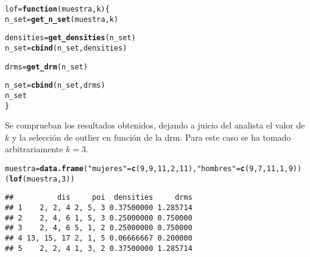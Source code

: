 \documentclass[12pt]{report}\usepackage[]{graphicx}\usepackage[dvipsnames]{xcolor}
\makeatletter
\newcommand{\hlnum}[1]{\textcolor[rgb]{0.686,0.059,0.569}{#1}}%
\newcommand{\hlstr}[1]{\textcolor[rgb]{0.192,0.494,0.8}{#1}}%
\newcommand{\hlstd}[1]{\textcolor[rgb]{0.345,0.345,0.345}{#1}}%
\newcommand{\hlkwa}[1]{\textcolor[rgb]{0.161,0.373,0.58}{\textbf{#1}}}%
\newcommand{\hlkwb}[1]{\textcolor[rgb]{0.69,0.353,0.396}{#1}}%
\newcommand{\hlkwc}[1]{\textcolor[rgb]{0.333,0.667,0.333}{#1}}%
\newcommand{\hlkwd}[1]{\textcolor[rgb]{0.737,0.353,0.396}{\textbf{#1}}}%
\newenvironment{kframe}{%
 \def\at@end@of@kframe{}%
 \ifinner\ifhmode%
  \def\at@end@of@kframe{\end{minipage}}%
  \begin{minipage}{\columnwidth}%
 \fi\fi%
 \def\FrameCommand##1{\hskip\@totalleftmargin \hskip-\fboxsep
 \colorbox{shadecolor}{##1}\hskip-\fboxsep
     \hskip-\linewidth \hskip-\@totalleftmargin \hskip\columnwidth}%
 \MakeFramed {\advance\hsize-\width
   \@totalleftmargin\z@ \linewidth\hsize
   \@setminipage}}%
 {\par\unskip\endMakeFramed%
 \at@end@of@kframe}
\newenvironment{knitrout}{}{} %
\makeatother
\begin{document}
\begin{knitrout}
\color{fgcolor}\begin{kframe}
\begin{alltt}
\hlstd{lof} \hlkwb{=} \hlkwa{function}\hlstd{(}\hlkwc{muestra}\hlstd{,} \hlkwc{k}\hlstd{) \{}
        \hlstd{n_set} \hlkwb{=} \hlkwd{get_n_set}\hlstd{(muestra, k)}

        \hlstd{densities} \hlkwb{=} \hlkwd{get_densities}\hlstd{(n_set)}
        \hlstd{n_set} \hlkwb{=} \hlkwd{cbind}\hlstd{(n_set, densities)}

        \hlstd{drms} \hlkwb{=} \hlkwd{get_drm}\hlstd{(n_set)}

        \hlstd{n_set} \hlkwb{=} \hlkwd{cbind}\hlstd{(n_set, drms)}
        \hlstd{n_set}
\hlstd{\}}
\end{alltt}
\end{kframe}
\end{knitrout}
						
						Se comprueban los resultados obtenidos, dejando a juicio del analista el valor de $k$ y la selección de outlier en función de la drm. Para este caso se ha tomado arbitrariamente $k = 3$. 
						
\begin{knitrout}
\color{fgcolor}\begin{kframe}
\begin{alltt}
\hlstd{muestra} \hlkwb{=} \hlkwd{data.frame}\hlstd{(}\hlstr{"mujeres"} \hlstd{=} \hlkwd{c}\hlstd{(}\hlnum{9}\hlstd{,}\hlnum{9}\hlstd{,}\hlnum{11}\hlstd{,}\hlnum{2}\hlstd{,}\hlnum{11}\hlstd{),} \hlstr{"hombres"} \hlstd{=} \hlkwd{c}\hlstd{(}\hlnum{9}\hlstd{,}\hlnum{7}\hlstd{,}\hlnum{11}\hlstd{,}\hlnum{1}\hlstd{,}\hlnum{9}\hlstd{))}
\hlstd{(}\hlkwd{lof}\hlstd{(muestra,} \hlnum{3}\hlstd{))}
\end{alltt}
\begin{verbatim}
##          dis     poi  densities     drms
## 1    2, 2, 4 2, 5, 3 0.37500000 1.285714
## 2    2, 4, 6 1, 5, 3 0.25000000 0.750000
## 3    2, 4, 6 5, 1, 2 0.25000000 0.750000
## 4 13, 15, 17 2, 1, 5 0.06666667 0.200000
## 5    2, 2, 4 1, 3, 2 0.37500000 1.285714
\end{verbatim}
\end{kframe}
\end{knitrout}
	
\end{document}
